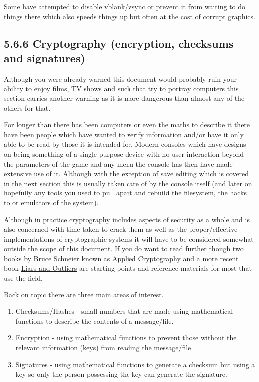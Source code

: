 \documentclass[
]{book}
\providecommand{\tightlist}{%
  \setlength{\itemsep}{0pt}\setlength{\parskip}{0pt}}
\begin{document}
Some have attempted to disable vblank/vsync or prevent it from waiting to do things there which also speeds things up but often at the cost of corrupt graphics.

\hypertarget{cryptography-encryption-checksums-and-signatures}{%
\subsection{5.6.6 Cryptography (encryption, checksums and signatures)}\label{cryptography-encryption-checksums-and-signatures}}

Although you were already warned this document would probably ruin your ability to enjoy films, TV shows and such that try to portray computers this section carries another warning as it is more dangerous than almost any of the others for that.

For longer than there has been computers or even the maths to describe it there have been people which have wanted to verify information and/or have it only able to be read by those it is intended for. Modern consoles which have designs on being something of a single purpose device with no user interaction beyond the parameters of the game and any menu the console has then have made extensive use of it. Although with the exception of save editing which is covered in the next section this is usually taken care of by the console itself (and later on hopefully any tools you used to pull apart and rebuild the filesystem, the hacks to or emulators of the system).

Although in practice cryptography includes aspects of security as a whole and is also concerned with time taken to crack them as well as the proper/effective implementations of cryptographic systems it will have to be considered somewhat outside the scope of this document. If you do want to read further though two books by Bruce Schneier known as \href{http://www.schneier.com/book-applied.html}{Applied Cryptography} and a more recent book \href{http://www.schneier.com/book-lo.html}{Liars and Outliers} are starting points and reference materials for most that use the field.

Back on topic there are three main areas of interest.

\begin{enumerate}
\def\labelenumi{\arabic{enumi}.}
\tightlist
\item
  Checksums/Hashes - small numbers that are made using mathematical functions to describe the contents of a message/file.
\item
  Encryption - using mathematical functions to prevent those without the relevant information (keys) from reading the message/file
\item
  Signatures - using mathematical functions to generate a checksum but using a key so only the person possessing the key can generate the signature.
\end{enumerate}
\end{document}
